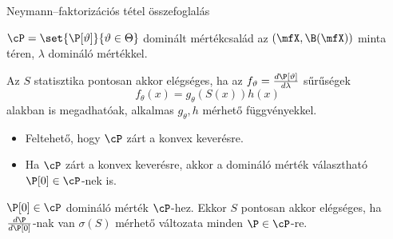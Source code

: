 \documentclass[aspectratio=169,notheorems,9pt,\option]{beamer}
\begin{document}
\begin{frame}[<*>]{Neymann--faktorizációs tétel összefoglalás}
\begin{theorem}
  $\cP=\set{\P[\theta]}{\theta\in\Theta}$ dominált mértékcsalád az 
  $(\mfX,\B(\mfX))$ minta téren, $\lambda$ domináló mértékkel. 
  
  Az $S$  statisztika pontosan akkor elégséges, ha az 
  $f_\theta=\frac{d\P[\theta]}{d\lambda}$ 
  sűrűségek
  \begin{displaymath}
    f_{\theta}(x)=g_{\theta}(S(x))h(x)  %
  \end{displaymath}
  alakban is megadhatóak, 
  alkalmas $g_\theta,h$ mérhető függvényekkel.
\end{theorem}
\begin{itemize}
  \item Feltehető, hogy $\cP$ zárt a konvex keverésre.
  \item Ha $\cP$ zárt a konvex keverésre, akkor a domináló mérték választható $\P[0]\in\cP$-nek is.
\end{itemize}
\begin{lemma}
  $\P[0]\in\cP$ domináló mérték $\cP$-hez. Ekkor $S$ pontosan akkor elégséges, ha $\frac{d\P}{d\P[0]}$-nak 
  van $\sigma(S)$ mérhető változata minden $\P\in\cP$-re.
\end{lemma}
\end{frame}
\end{document}
